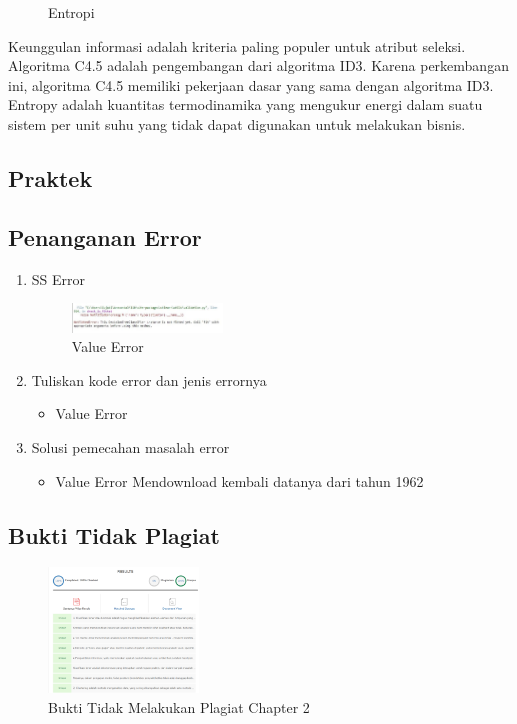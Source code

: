 \begin{enumerate}
\begin{figure}[H]
		\centering
		\caption{Entropi}
	\end{figure}
	\hfill\break
	Keunggulan informasi adalah kriteria paling populer untuk atribut seleksi. Algoritma C4.5 adalah pengembangan dari algoritma ID3. 
	Karena perkembangan ini, algoritma C4.5 memiliki pekerjaan dasar yang sama dengan algoritma ID3.
	Entropy adalah kuantitas termodinamika yang mengukur energi dalam suatu sistem per unit suhu yang tidak dapat digunakan untuk melakukan bisnis.
\end{enumerate}
\subsection{Praktek}

\subsection{Penanganan Error}
\begin{enumerate}
	\item SS Error
	\hfill\break
	\begin{figure}[H]
		\includegraphics[width=4cm]{figures/1174056/2/error/2.JPG}
		\centering
		\caption{Value Error}
	\end{figure}
	\item Tuliskan kode error dan jenis errornya
	\hfill\break
	\begin{itemize}
		\item Value Error
	\end{itemize}
	\item Solusi pemecahan masalah error
	\hfill\break
	\begin{itemize}
		\item Value Error
		\hfill\break
		Mendownload kembali datanya dari tahun 1962
	\end{itemize}
\end{enumerate}
\subsection{Bukti Tidak Plagiat}
\begin{figure}[H]
	\includegraphics[width=4cm]{figures/1174056/2/plagiat/plagiat.png}
	\centering
	\caption{Bukti Tidak Melakukan Plagiat Chapter 2}
\end{figure}